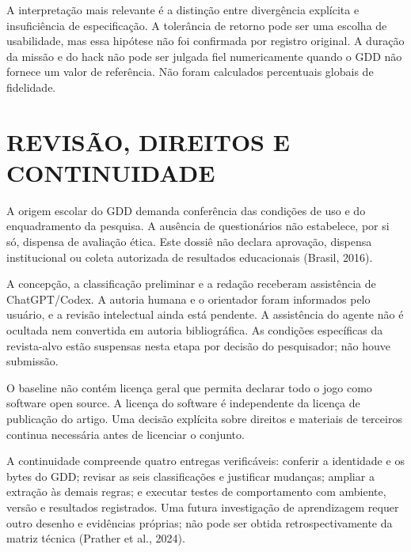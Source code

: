 A interpretação mais relevante é a distinção entre divergência explícita e insuficiência de especificação. A tolerância de retorno pode ser uma escolha de usabilidade, mas essa hipótese não foi confirmada por registro original. A duração da missão e do hack não pode ser julgada fiel numericamente quando o GDD não fornece um valor de referência. Não foram calculados percentuais globais de fidelidade.

\section{REVISÃO, DIREITOS E CONTINUIDADE}
A origem escolar do GDD demanda conferência das condições de uso e do enquadramento da pesquisa. A ausência de questionários não estabelece, por si só, dispensa de avaliação ética. Este dossiê não declara aprovação, dispensa institucional ou coleta autorizada de resultados educacionais (Brasil, 2016).

A concepção, a classificação preliminar e a redação receberam assistência de ChatGPT/Codex. A autoria humana e o orientador foram informados pelo usuário, e a revisão intelectual ainda está pendente. A assistência do agente não é ocultada nem convertida em autoria bibliográfica. As condições específicas da revista-alvo estão suspensas nesta etapa por decisão do pesquisador; não houve submissão.

O baseline não contém licença geral que permita declarar todo o jogo como software open source. A licença do software é independente da licença de publicação do artigo. Uma decisão explícita sobre direitos e materiais de terceiros continua necessária antes de licenciar o conjunto.

A continuidade compreende quatro entregas verificáveis: conferir a identidade e os bytes do GDD; revisar as seis classificações e justificar mudanças; ampliar a extração às demais regras; e executar testes de comportamento com ambiente, versão e resultados registrados. Uma futura investigação de aprendizagem requer outro desenho e evidências próprias; não pode ser obtida retrospectivamente da matriz técnica (Prather et al., 2024).
